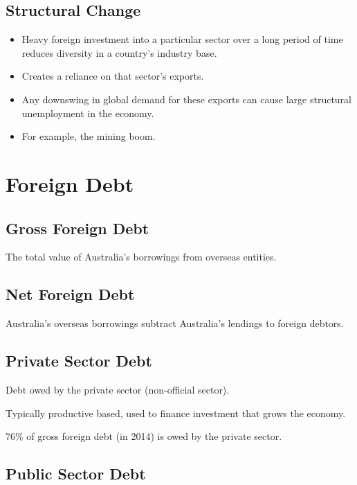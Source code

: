 \documentclass[a4paper,11pt]{article}
\begin{document}
\subsection{Structural Change}

\begin{itemize}
\item Heavy foreign investment into a particular sector over a long period of
	time reduces diversity in a country's industry base.
\item Creates a reliance on that sector's exports.
\item Any downswing in global demand for these exports can cause large
	structural unemployment in the economy.
\item For example, the mining boom.
\end{itemize}




\section{Foreign Debt}

\subsection{Gross Foreign Debt}

The total value of Australia's borrowings from overseas entities.


\subsection{Net Foreign Debt}

Australia's overseas borrowings subtract Australia's lendings to foreign
debtors.


\subsection{Private Sector Debt}

Debt owed by the private sector (non-official sector).

Typically productive based, used to finance investment that grows the
economy.

76\% of gross foreign debt (in 2014) is owed by the private sector.


\subsection{Public Sector Debt}
\end{document}
